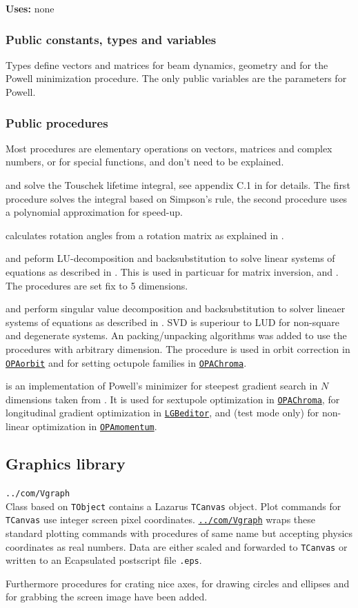\documentclass[12pt]{article}
\newcommand\code[1]{{\tt #1}}
\newcommand\guifco[1]{{\color{violet}\code{#1}}}
\newcommand{\unico}[1]{{\color{burntorange}\code{#1}}}
\newcommand{\opagui}[1]{\colorbox{blue!20}{\code{#1}}}
\newcommand{\ogui}[1]{\hyperref[#1]{\opagui{#1}}}
\newcommand{\opaguif}[1]{\colorbox{violet!30}{\code{#1}}}
\newcommand{\oguifh}[2]{\subsection{\label{#2}#1}{\Huge\opaguif{#2}}\\}
\newcommand{\oguif}[1]{\hyperref[#1]{\opaguif{#1}}}
\newcommand{\uses}[1]{{\bf Uses: } #1}
\newcommand{\desc}[1]{#1}
\newcommand{\pvar}[1]{\subsubsection*{Public constants, types and variables} #1}
\newcommand{\ppro}[1]{\subsubsection*{Public procedures} #1}
\begin{document}
\uses{none}

\pvar{
Types define vectors and matrices for beam dynamics, geometry and for the Powell minimization procedure. The only public variables are the parameters for Powell. 
}

\ppro{
Most procedures are elementary operations on vectors, matrices and complex numbers, or for special functions, and don't need to be explained.

\unico{CTouschek} and \unico{CTouschek\_pol} solve the Touschek lifetime integral, see appendix C.1 in \cite{inside} for details. The first procedure solves the integral based on Simpson's rule, the second procedure uses a polynomial approximation for speed-up. 

\unico{EulerAng} calculates rotation angles from a rotation matrix as explained in \cite{euler}.

\unico{LUDCMP} and \unico{LUBKSB} peform LU-decomposition and backsubstitution to solve linear systems of equations as described in \cite{numrec}. This is used in particuar for matrix inversion, \unico{MatInv} and \unico{MatDet}. The procedures are set fix to 5 dimensions.


\unico{svdcmp} and \unico{svbksb} perform singular value decomposition and backsubstitution to solver lineaer systems of equations as described in \cite{numrec}. SVD is superiour to LUD for non-square and degenerate systems. An packing/unpacking algorithms was added to use the procedures with arbitrary dimension. The procedure is used in orbit correction in \ogui{OPAorbit} and for setting octupole families in \ogui{OPAChroma}.

\unico{Powell} is an implementation of Powell's minimizer for steepest gradient search in $N$ dimensions taken from \cite{numrec}. It is used for sextupole optimization in \ogui{OPAChroma}, for longitudinal gradient optimization in \ogui{LGBeditor}, and (test mode only) for non-linear optimization in \ogui{OPAmomentum}.
}

\oguifh{Graphics library}{../com/Vgraph}

\desc{
Class \guifco{Vplot} based on \code{TObject} contains a Lazarus \code{TCanvas} object. Plot commands for \code{TCanvas}  use integer screen pixel coordinates. \oguif{../com/Vgraph} wraps these standard plotting commands with procedures of same name but accepting physics coordinates as real numbers. Data are either scaled and forwarded to \code{TCanvas}  or written to an Ecapsulated postscript file \code{*.eps}.

Furthermore procedures for crating nice axes, for drawing circles and ellipses and for grabbing the screen image have been added.
}
\end{document}

